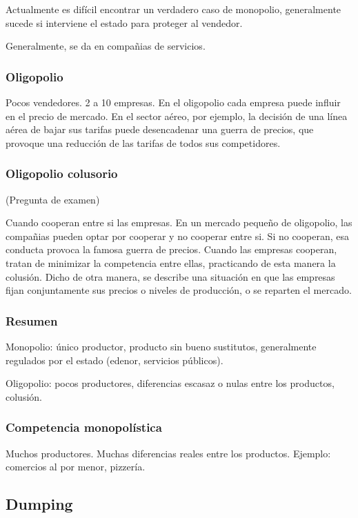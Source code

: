 Actualmente es difícil encontrar un verdadero caso de monopolio,
generalmente sucede si interviene el estado para proteger al vendedor.

Generalmente, se da en compañias de servicios.

\subsubsection{Oligopolio}

Pocos vendedores.
2 a 10 empresas.
En el oligopolio cada empresa puede influir en el precio de mercado.
En el sector aéreo, por ejemplo,
la decisión de una línea aérea de bajar sus tarifas puede desencadenar una guerra de precios,
que provoque una reducción de las tarifas de todos sus competidores.

\subsubsection{Oligopolio colusorio}

(Pregunta de examen)

Cuando cooperan entre si las empresas.
En un mercado pequeño de oligopolio,
las compañias pueden optar por cooperar y no cooperar entre si.
Si no cooperan, esa conducta provoca la famosa guerra de precios.
Cuando las empresas cooperan, tratan de minimizar la competencia entre ellas,
practicando de esta manera la colusión.
Dicho de otra manera,
se describe una situación en que las empresas fijan conjuntamente sus precios o niveles de producción,
o se reparten el mercado.

\subsubsection{Resumen}

Monopolio: único productor,
producto sin bueno sustitutos,
generalmente regulados por el estado (edenor, servicios públicos).

Oligopolio: pocos productores,
diferencias escasaz o nulas entre los productos,
colusión.

\subsubsection{Competencia monopolística}

Muchos productores. Muchas diferencias reales entre los productos.
Ejemplo: comercios al por menor, pizzería.

\subsection{Dumping}

